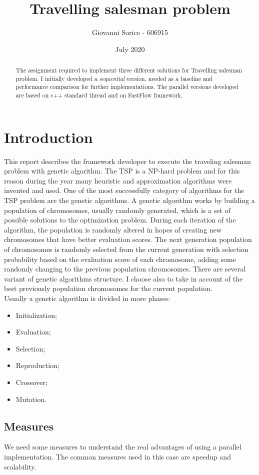 \documentclass[a4paper,10pt]{article}
\title{Travelling salesman problem}
\author{Giovanni Sorice - 606915}
\date{July 2020}
\begin{document}
	

		\maketitle
		\begin{abstract}
			The assignment required to implement three different solutions for Travelling salesman problem. I initially developed a \textit{sequential} version, needed as a baseline and performance comparison for further implementations. The parallel versions developed are based on c++ standard thread and on FastFlow framework.
		\end{abstract}

	
	\section{Introduction}
	This report describes the framework developer to execute the traveling salesman problem with genetic algorithm.
	The TSP is a NP-hard problem and for this reason during the year many heuristic and approximation algorithms were invented and used. One of the most successfully category of algorithms for the TSP problem are the genetic algorithms.
	A genetic algorithm works by building a population of chromosomes, usually randomly generated, which is a set of possible solutions to the optimization problem. During each iteration of the algorithm, the population is randomly altered in hopes of creating new chromosomes that have better evaluation scores. The next generation population of chromosomes is randomly selected from the current generation with selection probability based on the evaluation score of each chromosome, adding some randomly changing to the previous population chromosomes. There are several variant of genetic algorithms structure. I choose also to take in account of the best previously population chromosomes for the current population.
	\\
	Usually a genetic algorithm is divided in more phases:
	\begin{itemize}
		\item Initialization;
		\item Evaluation;
		\item Selection;
		\item Reproduction;
		\item Crossover;
		\item Mutation.
	\end{itemize}

	\subsection{Measures}
	We need some measures to understand the real advantages of using a parallel implementation. The common measures used in this case are speedup and scalability.
\end{document}

